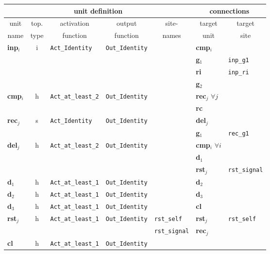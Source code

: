 {\begin{tabular}{|l|c|l|l|l||l|l|}
\multicolumn{5}{|c||}{{\bf unit definition}} &
        \multicolumn{2}{c|}{{\bf connections}} \\ 
\hline
%
\multicolumn{1}{|c}{unit} & \multicolumn{1}{|c}{top.} &
\multicolumn{1}{|c}{activation} & \multicolumn{1}{|c}{output} &
\multicolumn{1}{|c||}{site-} & \multicolumn{1}{c}{target} &
\multicolumn{1}{|c|}{target} \\ 
%
\multicolumn{1}{|c}{name} & \multicolumn{1}{|c}{type} &
\multicolumn{1}{|c|}{function} & \multicolumn{1}{|c}{function}
& \multicolumn{1}{|c||}{names} & \multicolumn{1}{c}{unit} &
\multicolumn{1}{|c|}{site} \\ 
\hline
%
{\bf inp}$_{i}$ & i & {\tt Act\_Identity}  & {\tt Out\_Identity}  & & {\bf cmp}$_{i}$ &  \\ 
& & & & & {\bf g}$_1$  &      {\tt inp\_g1} \\ 
& & & & & {\bf ri} & {\tt inp\_ri} \\ 
& & & & & {\bf g}$_2$  & \\ 
\hline
%
{\bf cmp}$_{i}$ & h & {\tt Act\_at\_least\_2} & {\tt Out\_Identity}  & & {\bf rec}$_{j}$ $\forall j$ & \\ 
& & & & & {\bf rc} & \\ 
\hline
%
{\bf rec}$_{j}$ & s & {\tt Act\_Identity}  & {\tt Out\_Identity}  & & {\bf del}$_{j}$ & \\ 
& & & & & {\bf g}$_1$  & {\tt rec\_g1} \\ 
\hline
%
{\bf del}$_{j}$ & h & {\tt Act\_at\_least\_2} & {\tt Out\_Identity}  & & {\bf cmp}$_{i}$ $\forall i$ & \\ 
& & & & & {\bf d}$_1$  & \\ 
& & & & & {\bf rst}$_{j}$ & {\tt rst\_signal} \\ 
\hline
%
{\bf d}$_1$ & h & {\tt Act\_at\_least\_1} & {\tt Out\_Identity}  & & {\bf d}$_2$ & \\ 
\hline
%
{\bf d}$_2$ & h & {\tt Act\_at\_least\_1} & {\tt Out\_Identity}  & & {\bf d}$_3$ & \\ 
\hline
%
{\bf d}$_3$ & h & {\tt Act\_at\_least\_1} & {\tt Out\_Identity}  & & {\bf cl} & \\ 
\hline
%
{\bf rst}$_{j}$ & h & {\tt Act\_at\_least\_1} & {\tt Out\_Identity}  & {\tt rst\_self} &
          {\bf rst}$_{j}$ & {\tt rst\_self} \\ 
& & & & {\tt rst\_signal} & {\bf rec}$_{j}$ & \\ 
\hline
%
{\bf cl} & h & {\tt Act\_at\_least\_1} & {\tt Out\_Identity}  & & & \\ 
\hline
%

\end{tabular}}

